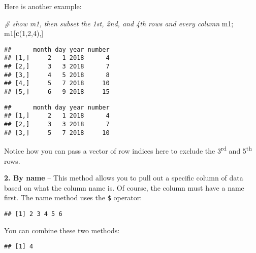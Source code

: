 \documentclass[]{book}
\newenvironment{Shaded}{\begin{snugshade}}{\end{snugshade}}
\newcommand{\CommentTok}[1]{\textcolor[rgb]{0.56,0.35,0.01}{\textit{#1}}}
\newcommand{\DecValTok}[1]{\textcolor[rgb]{0.00,0.00,0.81}{#1}}
\newcommand{\KeywordTok}[1]{\textcolor[rgb]{0.13,0.29,0.53}{\textbf{#1}}}
\newcommand{\NormalTok}[1]{#1}
\newcommand{\OperatorTok}[1]{\textcolor[rgb]{0.81,0.36,0.00}{\textbf{#1}}}
\begin{document}
Here is another example:

\begin{Shaded}
\begin{Highlighting}[]
\CommentTok{# show m1, then subset the 1st, 2nd, and 4th rows and every column}
\NormalTok{m1; m1[}\KeywordTok{c}\NormalTok{(}\DecValTok{1}\NormalTok{,}\DecValTok{2}\NormalTok{,}\DecValTok{4}\NormalTok{),]}
\end{Highlighting}
\end{Shaded}

\begin{verbatim}
##      month day year number
## [1,]     2   1 2018      4
## [2,]     3   3 2018      7
## [3,]     4   5 2018      8
## [4,]     5   7 2018     10
## [5,]     6   9 2018     15
\end{verbatim}

\begin{verbatim}
##      month day year number
## [1,]     2   1 2018      4
## [2,]     3   3 2018      7
## [3,]     5   7 2018     10
\end{verbatim}

Notice how you can pass a vector of row indices here to exclude the 3\textsuperscript{rd} and 5\textsuperscript{th} rows.

\textbf{2. By name} -- This method allows you to pull out a specific column of data based on what the column name is. Of course, the column must have a name first. The name method uses the \texttt{\$} operator:

\begin{Shaded}
\end{Shaded}

\begin{verbatim}
## [1] 2 3 4 5 6
\end{verbatim}

You can combine these two methods:

\begin{Shaded}
\end{Shaded}

\begin{verbatim}
## [1] 4
\end{verbatim}
\end{document}
